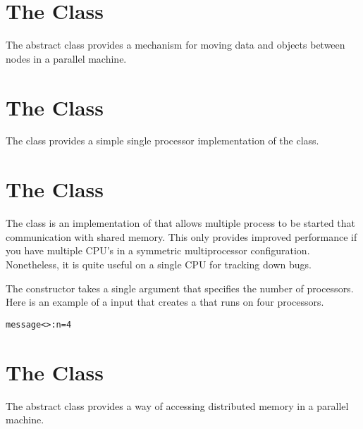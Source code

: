 

\section{The  Class}
\label{MessageGrp}

The  abstract class provides
a mechanism for moving data and objects between
nodes in a parallel machine.


\section{The  Class}
\label{ProcMessageGrp}

The  class provides
a simple single processor implementation of
the  class.


\section{The  Class}
\label{ShmMessageGrp}

The  class is an implementation of
 that allows multiple process to be
started that communication with shared memory.  This
only provides improved performance if you have multiple
CPU's in a symmetric multiprocessor configuration.  Nonetheless,
it is quite useful on a single CPU for tracking down bugs.

The   constructor takes
a single argument that specifies the number of processors.
Here is an example of a  input that
creates a  that runs on four processors.
\begin{alltt}
message<>: n = 4
\end{alltt}


\section{The  Class}
\label{MemoryGrp}

The  abstract class provides a way of accessing
distributed memory in a parallel machine.
